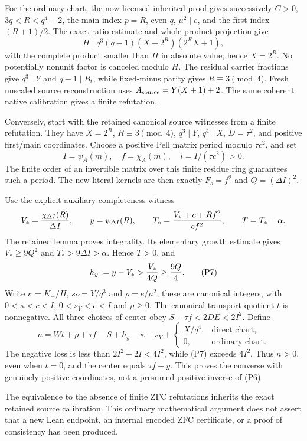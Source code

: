 For the ordinary chart, the now-licensed inherited proof gives successively $C>0$, $3q<R<q^4-2$, the main index $p=R$, even $q$, $\mu^2\mid e$, and the first index $(R+1)/2$. The exact ratio estimate and whole-product projection give
\[
 H\mid q^3(q-1)(X-2^R)(2^RX+1),
\]
with the complete product smaller than $H$ in absolute value; hence $X=2^R$. No potentially nonunit factor is canceled modulo $H$. The residual carrier fractions give $q^3\mid Y$ and $q-1\mid B_t$, while fixed-minus parity gives $R\equiv3\pmod4$. Fresh unscaled source reconstruction uses $A_{\rm source}=Y(X+1)+2$. The same coherent native calibration gives a finite refutation.

Conversely, start with the retained canonical source witnesses from a finite refutation. They have $X=2^R$, $R\equiv3\pmod4$, $q^3\mid Y$, $q^4\mid X$, $D=\tau^2$, and positive first/main coordinates. Choose a positive Pell matrix period modulo $\tau c^2$, and set
\[
 I=\psi_A(m),\quad f=\chi_A(m),\quad
 i=I/(\tau c^2)>0.
\]
The finite order of an invertible matrix over this finite residue ring guarantees such a period. The new literal kernels are then exactly $F_s=f^2$ and $Q=(\Delta I)^2$.

Use the explicit auxiliary-completeness witness
\[
 V_*={\chi_{\Delta I}(R)\over\Delta I},\qquad
 y=\psi_{\Delta I}(R),\qquad
 T_*={V_*+c+Rf^2\over cf^2},\qquad T=T_*-\alpha.
\]
The retained lemma proves integrality. Its elementary growth estimate gives $V_*\ge9Q^2$ and $T_*>9\Delta I>\alpha$. Hence $T>0$, and
\[
 h_y:=y-V_*>{V_*\over4Q}\ge{9Q\over4}. \tag{P7}
\]
Write $\kappa=K_+/H$, $s_Y=Y/q^3$ and $\rho=e/\mu^2$; these are canonical integers, with $0<\kappa<c<I$, $0<s_Y<c<I$ and $\rho\ge0$. The canonical transport quotient $t$ is nonnegative. All three choices of center obey $S-\tau f<2DE<2I^2$. Define
\[
 n=Wt+\rho+\tau f-S+h_y-\kappa-s_Y
       +\begin{cases}X/q^4,&\text{direct chart},\\0,&\text{ordinary chart}.\end{cases}
\]
The negative loss is less than $2I^2+2I<4I^2$, while (P7) exceeds $4I^2$. Thus $n>0$, even when $t=0$, and the center equals $\tau f+y$. This proves the converse with genuinely positive coordinates, not a presumed positive inverse of (P6).

The equivalence to the absence of finite ZFC refutations inherits the exact retained source calibration. This ordinary mathematical argument does not assert that a new Lean endpoint, an internal encoded ZFC certificate, or a proof of consistency has been produced.

